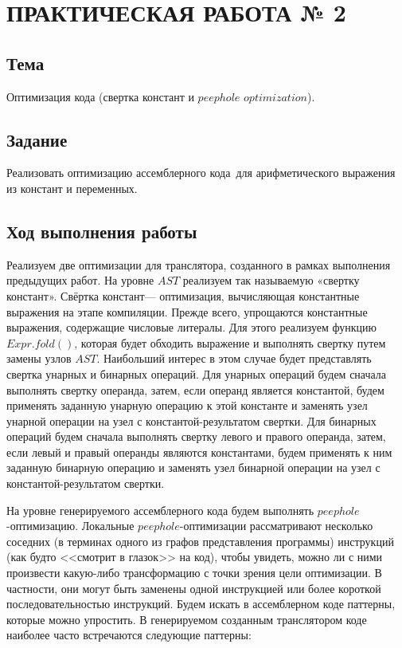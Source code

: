 \chapter{ПРАКТИЧЕСКАЯ РАБОТА № 2}

\section{Тема}

Оптимизация кода (свертка констант и $peephole$ $optimization$).

\section{Задание}

Реализовать оптимизацию ассемблерного кода для арифметического выражения из констант и переменных.

\section{Ход выполнения работы}

Реализуем две оптимизации для транслятора, созданного в рамках выполнения предыдущих работ. На уровне $AST$ реализуем так называемую «свертку констант». Свёртка констант--- оптимизация, вычисляющая константные выражения на этапе компиляции. Прежде всего, упрощаются константные выражения, содержащие числовые литералы. Для этого реализуем функцию $Expr.fold()$, которая будет обходить выражение и выполнять свертку путем замены узлов $AST$. Наибольший интерес в этом случае будет представлять свертка унарных и бинарных операций. Для унарных операций будем сначала выполнять свертку операнда, затем, если операнд является константой, будем применять заданную унарную операцию к этой константе и заменять узел унарной операции на узел с константой-результатом свертки. Для бинарных операций будем сначала выполнять свертку левого и правого операнда, затем, если левый и правый операнды являются константами, будем применять к ним заданную бинарную операцию и заменять узел бинарной операции на узел с константой-результатом свертки. 

На уровне генерируемого ассемблерного кода будем выполнять $peephole$-оптимизацию. Локальные $peephole$-оптимизации рассматривают несколько соседних (в терминах одного из графов представления программы) инструкций (как будто <<смотрит в глазок>> на код), чтобы увидеть, можно ли с ними произвести какую-либо трансформацию с точки зрения цели оптимизации. В частности, они могут быть заменены одной инструкцией или более короткой последовательностью инструкций. Будем искать в ассемблерном коде паттерны, которые можно упростить. В генерируемом созданным транслятором коде наиболее часто встречаются следующие паттерны:

